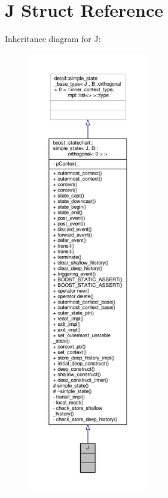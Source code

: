 \hypertarget{struct_j}{}\section{J Struct Reference}
\label{struct_j}


Inheritance diagram for J\+:
\nopagebreak
\begin{figure}[H]
\begin{center}
\leavevmode
\includegraphics[height=550pt]{struct_j__inherit__graph}
\end{center}
\end{figure}


